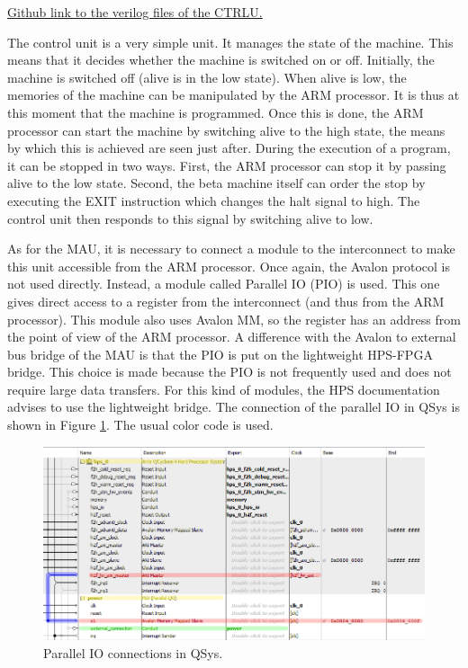 \href{https://github.com/AnotherGitAccount/TFE/tree/master/hardware/rtl/ctrlu}{Github link to the verilog files of the CTRLU.}

The control unit is a very simple unit. It manages the state of the machine. This means that 
it decides whether the machine is switched on or off. Initially, the machine is switched off (alive 
is in the low state). When alive is low, the memories of the machine can be manipulated by the ARM 
processor. It is thus at this moment that the machine is programmed. Once this is done, the ARM 
processor can start the machine by switching alive to the high state, the means by which this is 
achieved are seen just after. During the execution of a program, it can be stopped in two ways. 
First, the ARM processor can stop it by passing alive to the low state. Second, 
the beta machine itself can order the stop by executing the EXIT instruction which changes the 
halt signal to high. The control unit then responds to this signal by switching alive to low.

As for the MAU, it is necessary to connect a module to the interconnect to make this unit 
accessible from the ARM processor. Once again, the Avalon protocol is not used directly. 
Instead, a module called Parallel IO (PIO) is used. This one gives direct access to a register 
from the interconnect (and thus from the ARM processor). This module also uses Avalon MM, so 
the register has an address from the point of view of the ARM processor. A difference with 
the Avalon to external bus bridge of the MAU is that the PIO is put on the lightweight HPS-FPGA 
bridge. This choice is made because the PIO is not frequently used and does not require large data 
transfers. For this kind of modules, the HPS documentation advises to use the lightweight bridge.
The connection of the parallel IO in QSys is shown in Figure \ref{fig:qsys/ctrlu}. The usual color code is used.

\begin{figure}[ht!]
    \center
    \includegraphics[width=\linewidth]{"Chapter5-MAU_CTRLU/res/qsys_ctrlu.PNG"}
    \caption{Parallel IO connections in QSys.}
    \label{fig:qsys/ctrlu}
\end{figure}

